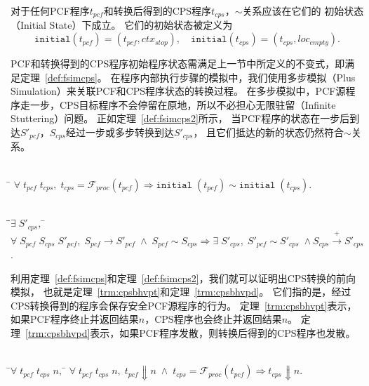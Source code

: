 对于任何PCF程序$t_{pcf}$和转换后得到的CPS程序$t_{cps}$，$\sim$关系应该在它们的
初始状态（Initial State）下成立。
它们的初始状态被定义为
\begin{equation}
\mathtt{initial}(t_{pcf}) = (t_{pcf}, ctx_{stop}),\quad
\mathtt{initial}(t_{cps}) = (t_{cps}, loc_{empty}).
\end{equation}

PCF和转换得到的CPS程序初始程序状态需满足上一节中所定义的不变式，即满足定理~\ref{def:fsimcps}。
在程序内部执行步骤的模拟中，我们使用多步模拟（Plus Simulation）来关联PCF和CPS程序状态的转换过程。
在多步模拟中，PCF源程序走一步，CPS目标程序不会停留在原地，所以不必担心无限驻留（Infinite Stuttering）问题。
正如定理~\ref{def:fsimcps2}所示，
当PCF程序的状态在一步后到达$S'_{pcf}$，$S_{cps}$经过一步或多步转换到达$S'_{cps}$，
且它们抵达的新的状态仍然符合$\sim$关系。

\begin{theorem}[CPS转换中初始状态的模拟]\label{def:fsimcps}
    \begin{tabbing}
      \\
    \quad\=\kill 
    \>$\forall\; t_{pcf} \; t_{cps},\;
       t_{cps}=\mathcal{F}_{proc}(t_{pcf})\Longrightarrow \mathtt{initial}\; (t_{pcf})
       \sim \mathtt{initial}\; (t_{cps}).$
    \end{tabbing}
\end{theorem}

\begin{theorem}[CPS转换中程序内部执行步骤的模拟]\label{def:fsimcps2}
    \begin{tabbing}
      \\
    \quad\=\qquad\=$\exists\; S'_{cps},\; $\=\kill
    \>$\forall \; S_{pcf}\; S_{cps}\; S'_{pcf},\; S_{pcf}\rightarrow S'_{pcf}\; \wedge \; S_{pcf}\sim S_{cps} \Longrightarrow \exists\; S'_{cps},\; S'_{pcf}\sim S'_{cps}\; \wedge
        S_{cps}\xrightarrow{+} S'_{cps}$.
    \end{tabbing}
\end{theorem}

利用定理~\ref{def:fsimcps}和定理~\ref{def:fsimcps2}，我们就可以证明出CPS转换的前向模拟，
也就是定理~\ref{trm:cpsbhvpt}和定理~\ref{trm:cpsbhvpd}。
它们指的是，经过CPS转换得到的程序会保存安全PCF源程序的行为。
定理~\ref{trm:cpsbhvpt}表示，如果PCF程序终止并返回结果$n$，CPS程序也会终止并返回结果$n$。
定理~\ref{trm:cpsbhvpd}表示，如果PCF程序发散，则转换后得到的CPS程序也发散。

\begin{theorem}[CPS程序对PCF程序终止行为的保存]\label{trm:cpsbhvpt} 
    \begin{tabbing}
     \\
    \quad\=$\forall \; t_{pcf}\; t_{cps}\; n,\; $\=\kill
    \>$\forall \; t_{pcf}\; t_{cps}\; n,\; t_{pcf}\Downarrow n\; \wedge \; t_{cps}=\mathcal{F}_{proc}(t_{pcf}) \Longrightarrow t_{cps}\Downarrow n.$
    \end{tabbing}
  \end{theorem}
  
